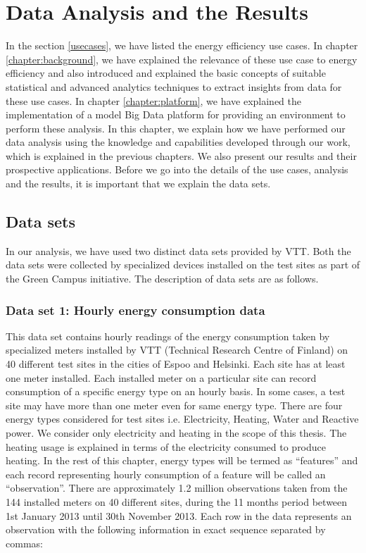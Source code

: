 \chapter{Data Analysis and the Results}
\label{chapter:Analysis}

In the section \ref{usecases}, we have listed the energy efficiency use cases. In chapter \ref{chapter:background}, we have explained the relevance of these use case to energy efficiency and also introduced and explained the basic concepts of suitable statistical and advanced analytics techniques to extract insights from data for these use cases. In chapter \ref{chapter:platform}, we have explained the implementation of a model Big Data platform for providing an environment to perform these analysis. In this chapter, we explain how we have performed our data analysis using the knowledge and capabilities developed through our work, which is explained in the previous chapters. We also present our results and their prospective applications. Before we go into the details of the use cases, analysis and the results, it is important that we explain the data sets.

\section{Data sets} \label{datasets}
In our analysis, we have used two distinct data sets provided by VTT. Both the data sets were collected by specialized devices installed on the test sites as part of the Green Campus initiative. The description of data sets are as follows.

\subsection{Data set 1: Hourly energy consumption data}
This data set contains hourly readings of the energy consumption taken by specialized meters installed by VTT (Technical Research Centre of Finland) on 40 different test sites in the cities of Espoo and Helsinki. Each site has at least one meter installed. Each installed meter on a particular site can record consumption of a specific energy type on an hourly basis. In some cases, a test site may have more than one meter even for same energy type. There are four energy types considered for test sites i.e. Electricity, Heating, Water and Reactive power. We consider only electricity and heating in the scope of this thesis. The heating usage is explained in terms of the electricity consumed to produce heating.  In the rest of this chapter, energy types will be termed as ``features'' and each record representing hourly consumption of a feature will be called an ``observation''.
There are approximately 1.2 million observations taken from the 144 installed meters on 40 different sites, during the 11 months period between 1st January 2013 until 30th November 2013.  Each row in the data represents an observation with the following information in exact sequence separated by commas: 


